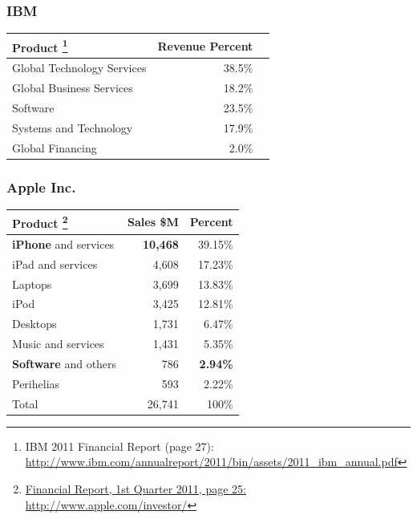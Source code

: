 \documentclass[18pt]{beamer}
\begin{document}
{
\begin{frame}
\frametitle{IBM}
\begin{center}
\begin{tabular}{lrr}
\hline
\textbf{Product}
\footnote{IBM 2011 Financial Report (page 27):
\url{http://www.ibm.com/annualreport/2011/bin/assets/2011_ibm_annual.pdf}}
& \textbf{Revenue Percent} \\
\hline
\hline
Global Technology Services & 38.5\% \\
Global Business Services & 18.2\% \\
Software & 23.5\%\\
Systems and Technology & 17.9\% \\
Global Financing & 2.0\% \\
\hline
\end{tabular}
\end{center}
\end{frame}
}


{
\begin{frame}
\frametitle{Apple Inc.}

\begin{center}
\begin{tabular}{lrr}
\hline
\textbf{Product}
\footnote{
\href{http://phx.corporate-ir.net/External.File?item=UGFyZW50SUQ9NzgwODJ8Q2hpbGRJRD0tMXxUeXBlPTM=&t=1}
{Financial Report, 1st Quarter 2011, page 25:}
 \url{http://www.apple.com/investor/} }
& \textbf{Sales \$M}
& \textbf{Percent} \\
\hline
\hline
\textbf{iPhone} and services & \textbf{10,468} &  39.15\%  \\
iPad and services & 4,608 & 17.23\% \\
Laptops & 3,699 & 13.83\% \\
iPod & 3,425 & 12.81\% \\
Desktops & 1,731 & 6.47\% \\
Music and services & 1,431 & 5.35\%  \\
\textbf{Software} and others &  786 & \textbf{2.94\%} \\
Perihelias &  593 & 2.22\% \\
\hline
Total &  26,741 & 100\% \\
\end{tabular}

\end{center}
\end{frame}
}
\end{document}
